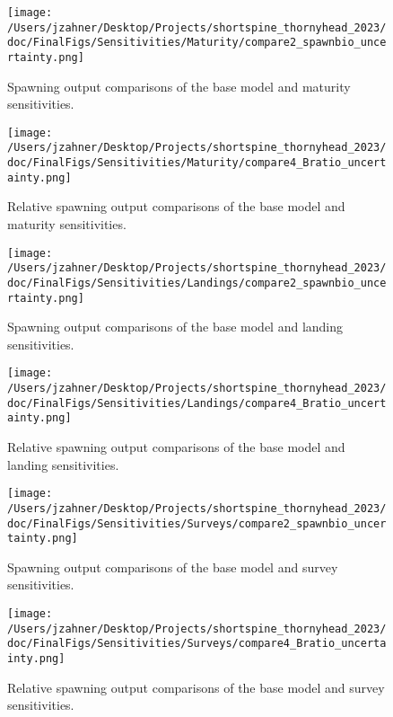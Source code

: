 \documentclass[11pt,
  english,
  letterpaper,
]{article}
\begin{document}
\begin{figure}
\centering
\texttt{[image: /Users/jzahner/Desktop/Projects/shortspine\_thornyhead\_2023/doc/FinalFigs/Sensitivities/Maturity/compare2\_spawnbio\_uncertainty.png]}
\caption{Spawning output comparisons of the base model and maturity sensitivities.\label{fig:mat_sensitiv_spawning}}
\end{figure}

\begin{figure}
\centering
\texttt{[image: /Users/jzahner/Desktop/Projects/shortspine\_thornyhead\_2023/doc/FinalFigs/Sensitivities/Maturity/compare4\_Bratio\_uncertainty.png]}
\caption{Relative spawning output comparisons of the base model and maturity sensitivities.\label{fig:mat_sensitiv_mngmt}}
\end{figure}

\begin{figure}
\centering
\texttt{[image: /Users/jzahner/Desktop/Projects/shortspine\_thornyhead\_2023/doc/FinalFigs/Sensitivities/Landings/compare2\_spawnbio\_uncertainty.png]}
\caption{Spawning output comparisons of the base model and landing sensitivities.\label{fig:land_sensitiv_spawning}}
\end{figure}

\begin{figure}
\centering
\texttt{[image: /Users/jzahner/Desktop/Projects/shortspine\_thornyhead\_2023/doc/FinalFigs/Sensitivities/Landings/compare4\_Bratio\_uncertainty.png]}
\caption{Relative spawning output comparisons of the base model and landing sensitivities.\label{fig:land_sensitiv_mngmt}}
\end{figure}

\begin{figure}
\centering
\texttt{[image: /Users/jzahner/Desktop/Projects/shortspine\_thornyhead\_2023/doc/FinalFigs/Sensitivities/Surveys/compare2\_spawnbio\_uncertainty.png]}
\caption{Spawning output comparisons of the base model and survey sensitivities.\label{fig:surv_sensitiv_spawning}}
\end{figure}

\begin{figure}
\centering
\texttt{[image: /Users/jzahner/Desktop/Projects/shortspine\_thornyhead\_2023/doc/FinalFigs/Sensitivities/Surveys/compare4\_Bratio\_uncertainty.png]}
\caption{Relative spawning output comparisons of the base model and survey sensitivities.\label{fig:surv_sensitiv_mngmt}}
\end{figure}
\end{document}
